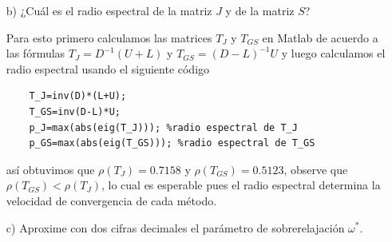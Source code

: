\begin{enumerate}
    \item[b)] ¿Cuál es el radio espectral de la matriz $J$ y de la matriz $S$?

    \begin{solution}
        Para esto primero calculamos las matrices $T_J$ y $T_{GS}$ en Matlab de acuerdo a las fórmulas $T_J=D^{-1}(U+L)$ y $T_{GS} = (D-L)^{-1}U$ y luego calculamos el radio espectral usando el siguiente código
        \begin{lstlisting}
    T_J=inv(D)*(L+U); 
    T_GS=inv(D-L)*U;
    p_J=max(abs(eig(T_J))); %radio espectral de T_J
    p_GS=max(abs(eig(T_GS))); %radio espectral de T_GS
        \end{lstlisting}
        así obtuvimos que $\rho(T_J) = 0.7158$ y $\rho(T_{GS}) = 0.5123$, observe que $\rho(T_{GS}) < \rho(T_{J})$, lo cual es esperable pues el radio espectral determina la velocidad de convergencia de cada método.
    \end{solution}

    \item[c)] Aproxime con dos cifras decimales el parámetro de sobrerelajación $\omega^*$.


\end{enumerate}
